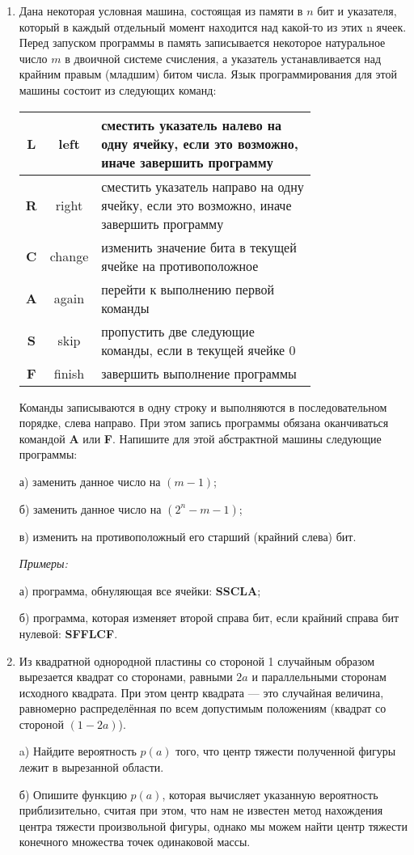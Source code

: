 \documentclass[11pt, a4paper]{article}
\begin{document}
\begin{enumerate}
\item  Дана некоторая условная машина, состоящая из памяти в $n$ бит и указателя, который в каждый отдельный момент находится над какой-то из этих n ячеек. Перед запуском программы в память записывается некоторое натуральное число $m$ в двоичной системе счисления, а указатель устанавливается над крайним правым (младшим) битом числа. Язык программирования для этой машины состоит из следующих команд:

\begin{center}
\begin{tabular}{|c|c|p{0.75\linewidth}|}
\hline
{\bf L} & left & сместить указатель налево на одну ячейку, если это возможно, иначе завершить программу\\
\hline
{\bf R} & right & сместить указатель направо на одну ячейку, если это возможно, иначе завершить программу\\
\hline
{\bf C} & change & изменить значение бита в текущей ячейке на противоположное\\
\hline
{\bf A} & again & перейти к выполнению первой команды\\
\hline
{\bf S} & skip & пропустить две следующие команды, если в текущей ячейке 0\\
\hline
{\bf F} & finish & завершить выполнение программы\\
\hline
\end{tabular}
\end{center}

Команды записываются в одну строку и выполняются в последовательном порядке, слева направо. При этом запись программы обязана оканчиваться командой \textbf{A} или \textbf{F}. Напишите для этой абстрактной машины следующие программы:

а) заменить данное число на $(m - 1)$;

б) заменить данное число на $(2^n - m - 1)$;

в) изменить на противоположный его старший (крайний слева) бит.

\textit{Примеры:}

а) программа, обнуляющая все ячейки: \textbf{SSCLA};

б) программа, которая изменяет второй справа бит, если крайний справа бит нулевой: \textbf{SFFLCF}.


\item Из квадратной однородной пластины со стороной 1 случайным образом вырезается квадрат со сторонами, равными $2a$ и параллельными сторонам исходного квадрата. При этом центр квадрата --- это случайная величина, равномерно распределённая по всем допустимым положениям (квадрат со стороной $(1 - 2a)$).

a) Найдите вероятность $p(a)$ того, что центр тяжести полученной фигуры лежит в вырезанной области.

б) Опишите функцию $p(a)$, которая вычисляет указанную вероятность приблизительно, считая при этом, что нам не известен метод нахождения центра тяжести произвольной фигуры, однако мы можем найти центр тяжести конечного множества точек одинаковой массы.

\end{enumerate}
\end{document}
